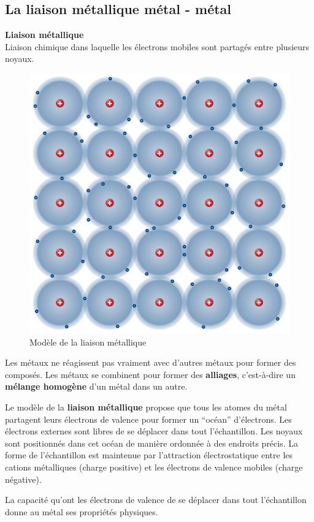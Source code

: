 \documentclass[
  11pt,
  french,
  a4paper,
  openany]{book}
\begin{document}
\newpage

\hypertarget{la-liaison-muxe9tallique-muxe9tal---muxe9tal}{%
\subsection{La liaison métallique \textbar{} métal - métal}\label{la-liaison-muxe9tallique-muxe9tal---muxe9tal}}

\begin{tcolorbox}
\textbf{Liaison métallique}\\
Liaison chimique dans laquelle les électrons mobiles sont partagés entre plusieurs noyaux.

\end{tcolorbox}

\begin{figure}

{\centering \includegraphics[width=0.4\linewidth]{images/metallic-bonding} 

}

\caption{Modèle de la liaison métallique}\label{fig:metallic-bonding}
\end{figure}

Les métaux ne réagissent pas vraiment avec d'autres métaux pour former des composés. Les métaux se combinent pour former des \textbf{alliages}, c'est-à-dire un \textbf{mélange homogène} d'un métal dans un autre.

Le modèle de la \textbf{liaison métallique} propose que tous les atomes du métal partagent leurs électrons de valence pour former un ``océan'' d'électrons. Les électrons externes sont libres de se déplacer dans tout l'échantillon. Les noyaux sont positionnés dans cet océan de manière ordonnée à des endroits précis. La forme de l'échantillon est maintenue par l'attraction électrostatique entre les cations métalliques (charge positive) et les électrons de valence mobiles (charge négative).

La capacité qu'ont les électrons de valence de se déplacer dans tout l'échantillon donne au métal ses propriétés physiques.
\end{document}
